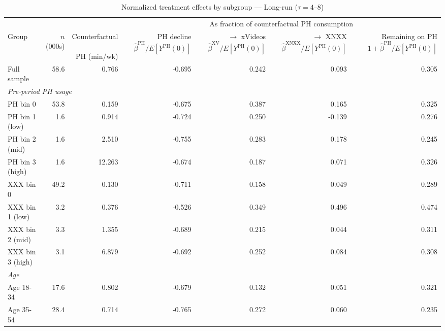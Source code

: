 \begin{landscape}
\begin{table}[htbp]
\centering
\caption{Normalized treatment effects by subgroup --- Long-run ($\tau = 4$--$8$)}
\label{tab:normalized_het_lt}
\begin{tabular}{lrr rrrr}
\toprule
& & & \multicolumn{4}{c}{As fraction of counterfactual PH consumption} \\
\cmidrule(lr){4-7}
Group & $n$ (000s) & \shortstack{Counterfactual \\\\ PH (min/wk)} & \shortstack{PH decline \\\\ $\hat{\beta}^{\text{PH}}/E[Y^{\text{PH}}(0)]$} & \shortstack{$\to$ xVideos \\\\ $\hat{\beta}^{\text{XV}}/E[Y^{\text{PH}}(0)]$} & \shortstack{$\to$ XNXX \\\\ $\hat{\beta}^{\text{XNXX}}/E[Y^{\text{PH}}(0)]$} & \shortstack{Remaining on PH \\\\ $1 + \hat{\beta}^{\text{PH}}/E[Y^{\text{PH}}(0)]$}
\\ \midrule
Full sample & 58.6 & 0.766 & -0.695 & 0.242 & 0.093 & 0.305 \\
\midrule
\multicolumn{7}{l}{\textit{Pre-period PH usage}} \\
PH bin 0 & 53.8 & 0.159 & -0.675 & 0.387 & 0.165 & 0.325 \\
PH bin 1 (low) & 1.6 & 0.914 & -0.724 & 0.250 & -0.139 & 0.276 \\
PH bin 2 (mid) & 1.6 & 2.510 & -0.755 & 0.283 & 0.178 & 0.245 \\
PH bin 3 (high) & 1.6 & 12.263 & -0.674 & 0.187 & 0.071 & 0.326 \\
XXX bin 0 & 49.2 & 0.130 & -0.711 & 0.158 & 0.049 & 0.289 \\
XXX bin 1 (low) & 3.2 & 0.376 & -0.526 & 0.349 & 0.496 & 0.474 \\
XXX bin 2 (mid) & 3.3 & 1.355 & -0.689 & 0.215 & 0.044 & 0.311 \\
XXX bin 3 (high) & 3.1 & 6.879 & -0.692 & 0.252 & 0.084 & 0.308 \\
\midrule
\multicolumn{7}{l}{\textit{Age}} \\
Age 18-34 & 17.6 & 0.802 & -0.679 & 0.132 & 0.051 & 0.321 \\
Age 35-54 & 28.4 & 0.714 & -0.765 & 0.272 & 0.060 & 0.235 \\

\end{tabular}
\end{table}
\end{landscape}
